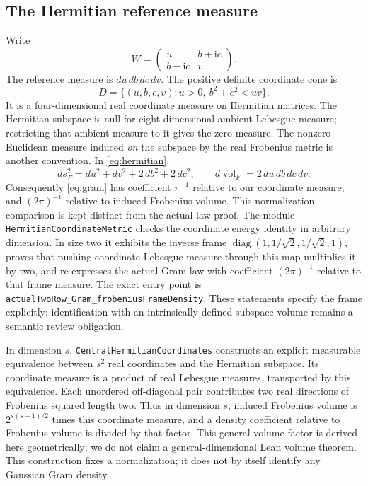\documentclass[11pt]{article}
\newcommand{\lean}[1]{{\small\nolinkurl{#1}}}
\begin{document}
\subsection{The Hermitian reference measure}
Write
\begin{equation}\label{eq:hermitian}
 W=\begin{pmatrix}u&b+\mathrm{i}c\\b-\mathrm{i}c&v\end{pmatrix}.
\end{equation}
The reference measure is $du\,db\,dc\,dv$. The positive definite coordinate
cone is
\[
 D=\{(u,b,c,v):u>0,\ b^2+c^2<uv\}.
\]
It is a four-dimensional real coordinate measure on Hermitian matrices.
The Hermitian subspace is null for eight-dimensional ambient Lebesgue measure;
restricting that ambient measure to it gives the zero measure.
The nonzero Euclidean measure induced \emph{on} the subspace by the real
Frobenius metric is another convention. In \eqref{eq:hermitian},
\[
 ds_F^2=du^2+dv^2+2\,db^2+2\,dc^2,\qquad
 d\operatorname{vol}_F=2\,du\,db\,dc\,dv.
\]
Consequently \eqref{eq:gram} has coefficient $\pi^{-1}$ relative to our
coordinate measure, and $(2\pi)^{-1}$ relative to induced Frobenius volume.
This normalization comparison is kept distinct from the actual-law proof.
The module \lean{HermitianCoordinateMetric} checks the coordinate energy
identity in arbitrary dimension. In size two it exhibits the inverse frame
$\operatorname{diag}(1,1/\sqrt2,1/\sqrt2,1)$, proves that pushing coordinate
Lebesgue measure through this map multiplies it by two, and re-expresses the
actual Gram law with coefficient $(2\pi)^{-1}$ relative to that frame measure.
The exact entry point is \lean{actualTwoRow_Gram_frobeniusFrameDensity}.
These statements specify the frame explicitly; identification with an
intrinsically defined subspace volume remains a semantic review obligation.

In dimension $s$, \lean{CentralHermitianCoordinates} constructs an explicit
measurable equivalence between $s^2$ real coordinates and the Hermitian
subspace. Its coordinate measure is a product of real Lebesgue measures,
transported by this equivalence. Each unordered off-diagonal pair contributes
two real directions of Frobenius squared length two. Thus in dimension $s$,
induced Frobenius volume is $2^{s(s-1)/2}$ times this coordinate measure, and
a density coefficient relative to Frobenius volume is divided by that factor.
This general volume factor is derived here geometrically; we do not claim
a general-dimensional Lean volume theorem. This construction fixes a normalization;
it does not by itself identify any Gaussian Gram density.
\end{document}
